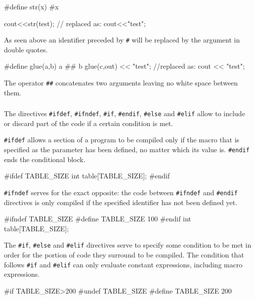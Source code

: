 \documentclass[10pt,a4paper]{scrartcl}
\begin{document}
\begin{multicols*}{2}
\begin{TPCpp}
#define str(x) #x

cout<<str(test); // replaced as: cout<<"test";
\end{TPCpp}

As seen above an identifier preceded by \verb+#+ will be replaced by the argument in double quotes.

\begin{TPCpp}
#define glue(a,b) a ## b
glue(c,out) << "test"; //replaced as: cout << "test";
\end{TPCpp}

The operator \verb+##+ concatenates two arguments leaving no white space between them.

\subsubsection{}
\label{sec:ConditionalInclusions}

The directives \verb+#ifdef+, \verb+#ifndef+, \verb+#if+, \verb+#endif+, \verb+#else+ and \verb+#elif+ allow to include or discard part of the code if a certain condition is met.

\verb+#ifdef+ allows a section of a program to be compiled only if the macro that is specified as the parameter has been defined, no matter which its value is. \verb+#endif+ ends the conditional block.

\begin{TPCpp}
#ifdef TABLE_SIZE
int table[TABLE_SIZE];
#endif
\end{TPCpp}

\verb+#ifndef+ serves for the exact opposite: the code between \verb+#ifndef+ and \verb+#endif+ directives is only compiled if the specified identifier has not been defined yet.

\begin{TPCpp}
#ifndef TABLE_SIZE
#define TABLE_SIZE 100
#endif
int table[TABLE_SIZE];
\end{TPCpp}

The \verb+#if+, \verb+#else+ and \verb+#elif+ directives serve to specify some condition to be met in order for the portion of code they surround to be compiled. The condition that follows \verb+#if+ and \verb+#elif+ can only evaluate constant expressions, including macro expressions.

\begin{TPCpp}
#if TABLE_SIZE>200
#undef TABLE_SIZE
#define TABLE_SIZE 200


\end{TPCpp}
\end{multicols*}
\end{document}
